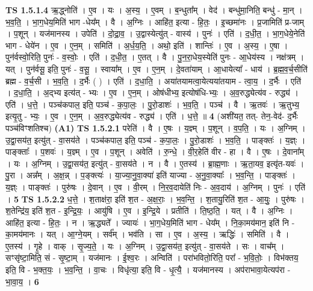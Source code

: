 \documentclass[17pt]{extarticle}
\begin{document}
                  \newline
                                \textbf{ TS 1.5.1.4} \newline
                  ऋ॒द्ध्नोति॑ । ए॒व । यः । अ॒स्य॒ । ए॒वम् । ब॒न्धुता᳚म् । वेद॑ । बन्धु॑मा॒निति॒ बन्धु॑ - मा॒न् । भ॒व॒ति॒ । भा॒ग॒धेय॒मिति॑ भाग -धेय᳚म् । वै । अ॒ग्निः । आहि॑त॒ इत्या - हि॒तः॒ । इ॒च्छमा॑नः । प्र॒जामिति॑ प्र-जाम् । प॒शून् । यज॑मानस्य । उपेति॑ । दो॒द्रा॒व॒ । उ॒द्वास्येत्यु॑त् - वास्य॑ । पुनः॑ । एति॑ । द॒धी॒त॒ । भा॒ग॒धेये॒नेति॑ भाग - धेये॑न । ए॒व । ए॒न॒म् । समिति॑ । अ॒र्ध॒य॒ति॒ । अथो॒ इति॑ । शान्तिः॑ । ए॒व । अ॒स्य॒ । ए॒षा । पुन॑र्वस्वो॒रिति॒ पुनः॑ - व॒स्वोः॒ । एति॑ । द॒धी॒त॒ । ए॒तत् । वै । पु॒न॒रा॒धेय॒स्येति॑ पुनः - आ॒धेय॑स्य । नक्ष॑त्रम् । यत् । पुन॑र्वसू॒ इति॒ पुनः॑ - व॒सू॒ । स्वाया᳚म् । ए॒व । ए॒न॒म् । दे॒वता॑याम् । आ॒धायेत्या᳚ - धाय॑ । ब्र॒ह्म॒व॒र्च॒सीति॑ ब्रह्म - व॒र्च॒सी । भ॒व॒ति॒ । द॒र्भैः ( ) । एति॑ । द॒धा॒ति॒ । अया॑तयामत्वा॒येत्यया॑तयाम - त्वा॒य॒ । द॒र्भैः । एति॑ । द॒धा॒ति॒ । अ॒द्भ्य इत्य॑त् - भ्यः । ए॒व । ए॒न॒म् । ओष॑धीभ्य॒ इत्योष॑धि-भ्यः॒ । अ॒व॒रुद्ध्येत्य॑व - रुद्ध्य॑ । एति॑ । ध॒त्ते॒ । पञ्च॑कपाल॒ इति॒ पञ्च॑ - क॒पा॒लः॒ । पु॒रो॒डाशः॑ । भ॒व॒ति॒ । पञ्च॑ । वै । ऋ॒तवः॑ । ऋ॒तुभ्य॒ इत्यृ॒तु - भ्यः॒ । ए॒व । ए॒न॒म् । अ॒व॒रुद्ध्येत्य॑व - रुद्ध्य॑ । एति॑ । ध॒त्ते॒ ॥ \textbf{  4} \newline
                  \newline
                      (अशी॑यत॒ तत्- तेन॒-वेद॑- द॒र्भैः पञ्च॑विꣳशतिश्च)  \textbf{(A1)} \newline \newline
                                \textbf{ TS 1.5.2.1} \newline
                  परेति॑ । वै । ए॒षः । य॒ज्ञ्म् । प॒शून् । व॒प॒ति॒ । यः । अ॒ग्निम् । उ॒द्वा॒सय॑त॒ इत्यु॑त् - वा॒सय॑ते । पञ्च॑कपाल॒ इति॒ पञ्च॑ - क॒पा॒लः॒ । पु॒रो॒डाशः॑ । भ॒व॒ति॒ । पाङ्क्तः॑ । य॒ज्ञ्ः । पाङ्क्ताः᳚ । प॒शवः॑ । य॒ज्ञ्म् । ए॒व । प॒शून् । अवेति॑ । रु॒न्धे॒ । वी॒र॒हेति॑ वीर - हा । वै । ए॒षः । दे॒वाना᳚म् । यः । अ॒ग्निम् । उ॒द्वा॒सय॑त॒ इत्यु॑त् - वा॒सय॑ते । न । वै । ए॒तस्य॑ । ब्रा॒ह्म॒णाः । ऋ॒ता॒यव॒ इत्यृ॑त-यवः॑ । पु॒रा । अन्न᳚म् । अ॒क्ष॒न्न् । प॒ङ्क्त्यः॑ । या॒ज्या॒नु॒वा॒क्या॑ इति॑ याज्या - अ॒नु॒वा॒क्याः᳚ । भ॒व॒न्ति॒ । पाङ्क्तः॑ । य॒ज्ञ्ः । पाङ्क्तः॑ । पुरु॑षः । दे॒वान् । ए॒व । वी॒रम् । नि॒र॒व॒दायेति॑ निः - अ॒व॒दाय॑ । अ॒ग्निम् । पुनः॑ । एति॑ । \textbf{  5} \newline
                  \newline
                                \textbf{ TS 1.5.2.2} \newline
                  ध॒त्ते॒ । श॒ताक्ष॑रा॒ इति॑ श॒त - अ॒क्ष॒राः॒ । भ॒व॒न्ति॒ । श॒तायु॒रिति॑ श॒त - आ॒युः॒ । पुरु॑षः । श॒तेन्द्रि॑य॒ इति॑ श॒त - इ॒न्द्रि॒यः॒ । आयु॑षि । ए॒व । इ॒न्द्रि॒ये । प्रतीति॑ । ति॒ष्ठ॒ति॒ । यत् । वै । अ॒ग्निः । आहि॑त॒ इत्या - हि॒तः॒ । न । ऋ॒द्ध्यते᳚ । ज्यायः॑ । भा॒ग॒धेय॒मिति॑ भाग - धेय᳚म् । नि॒का॒मय॑मान॒ इति॑ नि - का॒मय॑मानः । यत् । आ॒ग्ने॒यम् । सर्व᳚म् । भव॑ति । सा । ए॒व । अ॒स्य॒ । ऋद्धिः॑ । समिति॑ । वै । ए॒तस्य॑ । गृ॒हे । वाक् । सृ॒ज्य॒ते॒ । यः । अ॒ग्निम् । उ॒द्वा॒सय॑त॒ इत्यु॑त् - वा॒सय॑ते । सः । वाच᳚म् । सꣳसृ॑ष्टा॒मिति॒ सं - सृ॒ष्टा॒म् । यज॑मानः । ई॒श्व॒रः । अन्विति॑ । परा॑भवितो॒रिति॒ परा᳚ - भ॒वि॒तोः॒ । विभ॑क्तय॒ इति॒ वि - भ॒क्त॒यः॒ । भ॒व॒न्ति॒ । वा॒चः । विधृ॑त्या॒ इति॒ वि - धृ॒त्यै॒ । यज॑मानस्य । अप॑राभावा॒येत्यप॑रा - भा॒वा॒य॒ । \textbf{  6} \newline
\end{document}
